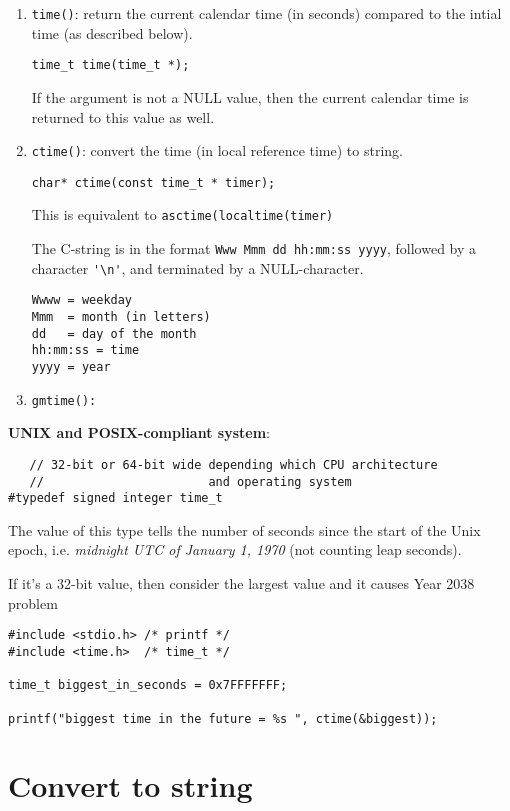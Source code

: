 \begin{enumerate}
  \item \verb!time()!: return the current calendar time (in seconds) compared to
  the intial time (as described below). 
  
\begin{verbatim}
time_t time(time_t *);
\end{verbatim}  
If the argument is not a NULL value, then the current calendar time is returned
to this value as well.

   \item \verb!ctime()!: convert the time (in local reference time) to string.

\begin{verbatim}
char* ctime(const time_t * timer); 
\end{verbatim}
This is equivalent to \verb!asctime(localtime(timer)!
   
The C-string is in the format \verb!Www Mmm dd hh:mm:ss yyyy!, followed by a
character \verb!'\n'!, and terminated by a NULL-character.
\begin{verbatim}
Wwww = weekday
Mmm  = month (in letters)
dd   = day of the month
hh:mm:ss = time 
yyyy = year
\end{verbatim}

   \item \verb!gmtime():!
\end{enumerate}

{\bf UNIX and POSIX-compliant system}: 
\begin{verbatim}
   // 32-bit or 64-bit wide depending which CPU architecture
   //                       and operating system
#typedef signed integer time_t
\end{verbatim}
The value of this type tells the number of seconds since the start of the Unix
epoch, i.e. {\it midnight UTC of January 1, 1970} (not counting leap seconds). 

If it's a 32-bit value, then consider the largest value and it causes Year 2038
problem
\begin{verbatim}
#include <stdio.h> /* printf */
#include <time.h>  /* time_t */

time_t biggest_in_seconds = 0x7FFFFFFF;

printf("biggest time in the future = %s ", ctime(&biggest));
\end{verbatim}

\section{Convert to string}
\label{sec:datetime_to_string}

